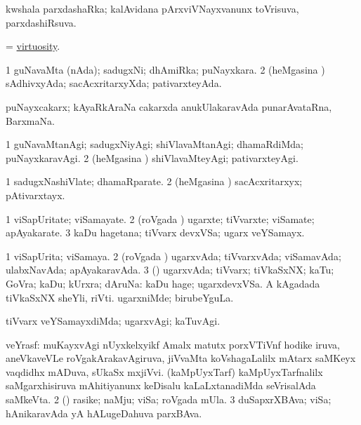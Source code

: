\bentry
{} 
\gl{\gu}
\expl{}
\bmng
 kwshala parxdashaRka; kalAvidana pArxviVNayxvanunx toVrisuva, parxdashiRsuva. 
\emng
\eentry

\bentry
{} 
\gl{\nA}
\expl{}
\bmng
 = \hyperlink{virtuosity}{virtuosity}. 
\emng
\eentry

\bentry
{} 
\gl{\gu}
\expl{}
\bmng
\bnum
\num{1} guNavaMta (nAda); sadugxNi; dhAmiRka; puNayxkara. 
\num{2} (heMgasina \vi) sAdhivxyAda; sacAcxritarxyXda; pativarxteyAda. 
\enum
\emng
\eentry

\bentry
{}
\gl{\nA}
\expl{}
\bmng
 puNayxcakarx; kAyaRkAraNa cakarxda anukUlakaravAda punarAvataRna, BarxmaNa. 
\emng
\eentry

\bentry
{} 
\gl{\kirxvi}
\expl{}
\bmng
\bnum
\num{1} guNavaMtanAgi; sadugxNiyAgi; shiVlavaMtanAgi; dhamaRdiMda; puNayxkaravAgi. 
\num{2} (heMgasina \vi) shiVlavaMteyAgi; pativarxteyAgi. 
\enum
\emng
\eentry

\bentry 
{} 
\gl{\nA}
\expl{}
\bmng
\bnum
\num{1} sadugxNashiVlate; dhamaRparate. 
\num{2} (heMgasina \vi) sacAcxritarxyx; pAtivarxtayx. 
\enum
\emng
\eentry

\bentry 
{} 
\gl{\nA}
\expl{}
\bmng
\bnum
\num{1} viSapUritate; viSamayate. 
\num{2} (roVgada \vi) ugarxte; tiVvarxte; viSamate; apAyakarate. 
\num{3} kaDu hagetana; tiVvarx devxVSa; ugarx veYSamayx. 
\enum
\emng
\eentry

\bentry
{} 
\gl{\gu}
\expl{}
\bmng
\bnum
\num{1} viSapUrita; viSamaya. 
\num{2} (roVgada \vi) ugarxvAda; tiVvarxvAda; viSamavAda; ulabxNavAda; apAyakaravAda. 
\num{3} (\rUpa) ugarxvAda; tiVvarx; tiVkaSxNX; kaTu; GoVra; kaDu; kUrxra; dAruNa:  kaDu hage; ugarxdevxVSa.  A kAgadada tiVkaSxNX sheYli, riVti.  ugarxniMde; birubeYguLa. 
\enum
\emng
\eentry

\bentry 
{} 
\gl{\kirxvi}
\expl{}
\bmng
 tiVvarx veYSamayxdiMda; ugarxvAgi; kaTuvAgi. 
\emng
\eentry

\bentry 
{} 
\gl{\nA}
\expl{}
\bmng
\bnum
{} 
\banum
{} veYrasf: muKayxvAgi nUyxkelxyikf Amalx matutx porxVTiVnf hodike iruva, aneVkaveVLe roVgakArakavAgiruva, jiVvaMta koVshagaLalilx mAtarx saMKeyx vaqdidhx mADuva, sUkaSx mxjiVvi. 
 (kaMpUyxTarf) kaMpUyxTarfnalilx saMgarxhisiruva mAhitiyanunx keDisalu kaLaLxtanadiMda seVrisalAda saMkeVta. 
\eanum
\numie
\num{2} (\pArxparx) rasike; naMju; viSa; roVgada mUla. 
\num{3} duSapxrXBAva; viSa; hAnikaravAda yA hALugeDahuva parxBAva. 
\enum
\emng
\eentry

